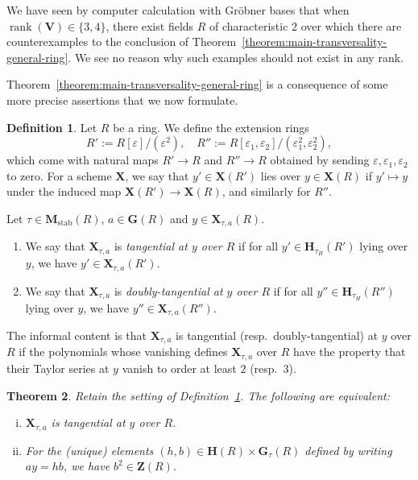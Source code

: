 \documentclass[reqno]{amsart}
\def\eps{\varepsilon}
\DeclareMathOperator{\stab}{stab}
\DeclareMathOperator{\rank}{rank}
\theoremstyle{plain} \newtheorem{theorem} {Theorem} \newtheorem{conjecture} {Conjecture} \newtheorem{corollary} [theorem] {Corollary} \newtheorem{proposition} [theorem] {Proposition} \newtheorem{fact} [theorem] {Fact}
\theoremstyle{definition} \newtheorem{definition} [theorem] {Definition}
\theoremstyle{itplain} %
\begin{document}
\begin{remark}\label{remark:we-have-seen-comp-calc-with-grobn-bases-that-when-}
  We have seen by computer calculation with Gr\"{o}bner bases that when $\rank(\mathbf{V}) \in \{3,4\}$, there exist fields $R$ of characteristic $2$ over which there are counterexamples to the conclusion of Theorem~\ref{theorem:main-transversality-general-ring}.  We see no reason why such examples should not exist in any rank.
\end{remark}

Theorem~\ref{theorem:main-transversality-general-ring} is a consequence of some more precise assertions that we now formulate.

\begin{definition}\label{definition:let-r-be-ring.-let-a-in-mathbfgr-y-in-mathbfx_t-ar}
  Let $R$ be a ring.  We define the extension rings
  \begin{equation*}
    R' := R[\eps]/(\eps^2), \quad
    R'' := R[\eps_1,\eps_2]/(\eps_1^2,\eps_2^2),
  \end{equation*}
  which come with natural maps $R' \rightarrow R$ and $R'' \rightarrow R$ obtained by sending $\eps, \eps_1, \eps_2$ to zero.  For a scheme $\mathbf{X}$, we say that $y' \in \mathbf{X}(R')$ lies over $y \in \mathbf{X}(R)$ if $y' \mapsto y$ under the induced map $\mathbf{X}(R') \rightarrow \mathbf{X}(R)$, and similarly for $R''$.

  Let $\tau \in \mathbf{M}_{\stab}(R)$, $a \in \mathbf{G}(R)$ and $y \in \mathbf{X}_{\tau,a}(R)$.
  \begin{enumerate}
  \item We say that $\mathbf{X}_{\tau,a}$ is \emph{tangential at $y$ over $R$} if for all $y' \in \mathbf{H}_{\tau_H}(R')$ lying over $y$, we have $y' \in \mathbf{X}_{\tau,a}(R')$.
  \item We say that $\mathbf{X}_{\tau,a}$ is \emph{doubly-tangential at $y$ over $R$} if for all $y'' \in \mathbf{H}_{\tau_H}(R'')$ lying over $y$, we have $y'' \in \mathbf{X}_{\tau,a}(R'')$.
  \end{enumerate}
\end{definition}
The informal content is that $\mathbf{X}_{\tau,a}$ is tangential (resp.\ doubly-tangential) at $y$ over $R$ if the polynomials whose vanishing defines $\mathbf{X}_{\tau,a}$ over $R$ have the property that their Taylor series at $y$ vanish to order at least $2$ (resp.\ $3$).

\begin{theorem}\label{theorem:characterization-of-tangential-points}
  Retain the setting of Definition~\ref{definition:let-r-be-ring.-let-a-in-mathbfgr-y-in-mathbfx_t-ar}.  The following are equivalent:
  \begin{enumerate}[(i)]
  \item $\mathbf{X}_{\tau,a}$ is tangential at $y$ over $R$.
  \item For the (unique) elements $(h,b) \in \mathbf{H}(R) \times \mathbf{G}_\tau(R)$ defined by writing $a y = h b$, we have $b^2 \in \mathbf{Z}(R)$.
  \end{enumerate}
\end{theorem}
\end{document}
